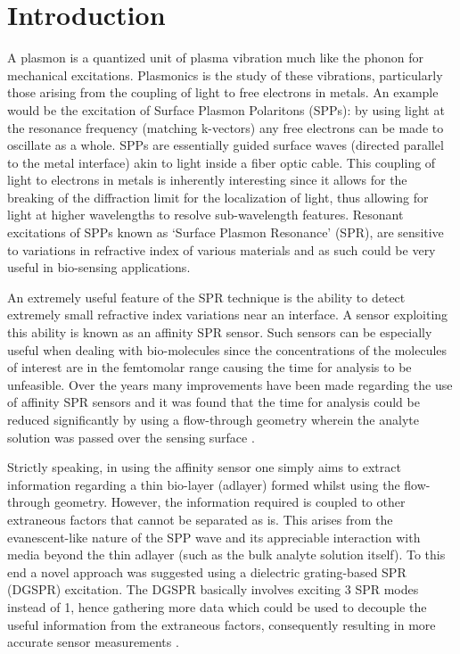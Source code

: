 

\chapter{Introduction}

A plasmon is a quantized unit of plasma vibration much like the phonon for mechanical excitations. Plasmonics is the study of these vibrations, particularly those arising from the coupling of light to free electrons in metals. An example would be the excitation of Surface Plasmon Polaritons (SPPs): by using light at the resonance frequency (matching k-vectors) any free electrons can be made to oscillate as a whole. SPPs are essentially guided surface waves (directed parallel to the metal interface) akin to light inside a fiber optic cable. This coupling of light to electrons in metals is inherently interesting since it allows for the breaking of the diffraction limit for the localization of light, thus allowing for light at higher wavelengths to resolve sub-wavelength features. Resonant excitations of SPPs known as `Surface Plasmon Resonance' (SPR), are sensitive to variations in refractive index of various materials and as such could be very useful in bio-sensing applications.


An extremely useful feature of the SPR technique is the ability to detect extremely small refractive index variations near an interface. A sensor exploiting this ability is known as an affinity SPR sensor. Such sensors can be especially useful when dealing with bio-molecules since the concentrations of the molecules of interest are in the femtomolar range causing the time for analysis to be unfeasible. Over the years many improvements have been made regarding the use of affinity SPR sensors and it was found that the time for analysis could be reduced significantly by using a flow-through geometry wherein the analyte solution was passed over the sensing surface \cite{plasmon_future_bio}.


Strictly speaking, in using the affinity sensor one simply aims to extract information regarding a thin bio-layer (adlayer) formed whilst using the flow-through geometry. However, the information required is coupled to other extraneous factors that cannot be separated as is. This arises from the evanescent-like nature of the SPP wave and its appreciable interaction with media beyond the thin adlayer (such as the bulk analyte solution itself). To this end a novel approach was suggested using a dielectric grating-based SPR (DGSPR) excitation. The DGSPR basically involves exciting 3 SPR modes instead of 1, hence gathering more data which could be used to decouple the useful information from the extraneous factors, consequently resulting in more accurate sensor measurements \cite{farshid_ol}. 

